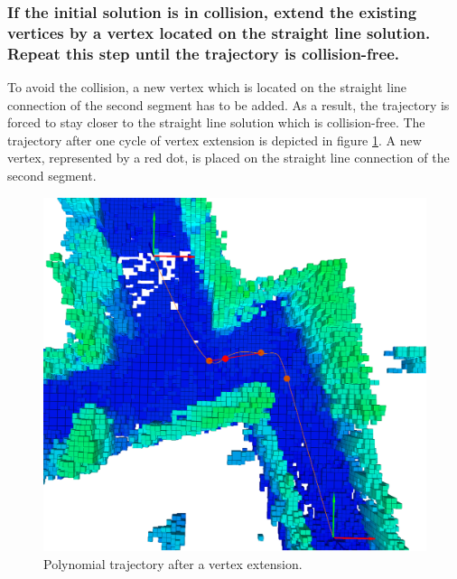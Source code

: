 \subsubsection{If the initial solution is in collision, extend the existing vertices by a vertex located on the straight line solution. Repeat this step until the trajectory is collision-free.}

To avoid the collision, a new vertex which is located on the straight line connection of the second segment has to be added. As a result, the trajectory is forced to stay closer to the straight line solution which is collision-free. \newline
The trajectory after one cycle of vertex extension is depicted in figure \ref{pic:RRTstep3}. A new vertex, represented by a red dot, is placed on the straight line connection of the second segment.

\begin{figure}[h]
   \centering
   \includegraphics[trim = 45mm 0mm 35mm 0mm, clip,width=1\textwidth]{pics/extensionBLongPred.eps}
   \caption{Polynomial trajectory after a vertex extension.}
\label{pic:RRTstep3}
\end{figure}

